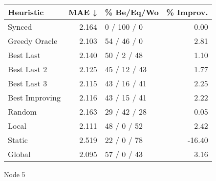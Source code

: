 \begin{tabular}{lrlr}
\toprule
\textbf{Heuristic} & \textbf{MAE ↓} & \textbf{\% Be/Eq/Wo} & \textbf{\% Improv.} \\
\midrule
            Synced &          2.164 &          0 / 100 / 0 &                0.00 \\
     Greedy Oracle &          2.103 &          54 / 46 / 0 &                2.81 \\
         Best Last &          2.140 &          50 / 2 / 48 &                1.10 \\
       Best Last 2 &          2.125 &         45 / 12 / 43 &                1.77 \\
       Best Last 3 &          2.115 &         43 / 16 / 41 &                2.25 \\
    Best Improving &          2.116 &         43 / 15 / 41 &                2.22 \\
            Random &          2.163 &         29 / 42 / 28 &                0.05 \\
             Local &          2.111 &          48 / 0 / 52 &                2.42 \\
            Static &          2.519 &          22 / 0 / 78 &              -16.40 \\
            Global &          2.095 &          57 / 0 / 43 &                3.16 \\
\bottomrule
\end{tabular}
\caption{Node 5}
\label{tab:hr_non_lr01_le1_bs2_5}
